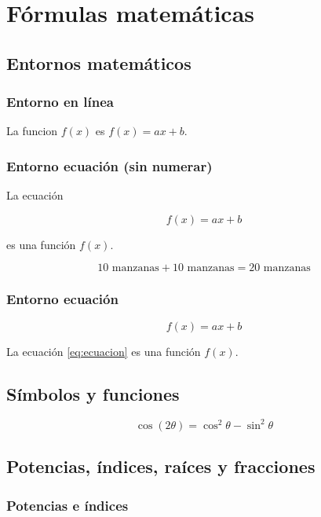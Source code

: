 \documentclass{article}
\begin{document}
\section{Fórmulas matemáticas}

\subsection{Entornos matemáticos}

\subsubsection{Entorno en línea}

La funcion $f(x)$ es $f(x)=ax+b$.

\subsubsection{Entorno ecuación (sin numerar)}
La ecuación

\[
  f(x)=ax+b
\]

es una función $f(x)$.

\[
  10 \text{ manzanas} + 10 \text{ manzanas} = 20 \text{ manzanas}
\]

\subsubsection{Entorno ecuación}

\begin{equation} \label{eq:ecuacion}
  f(x) = ax + b
\end{equation}

La ecuación \eqref{eq:ecuacion} es una función $f(x)$.

\subsection{Símbolos y funciones}

\[
  \cos (2\theta) = \cos^2 \theta - \sin^2 \theta
\]

\subsection{Potencias, índices, raíces y fracciones}

\subsubsection{Potencias e índices}
\end{document}
